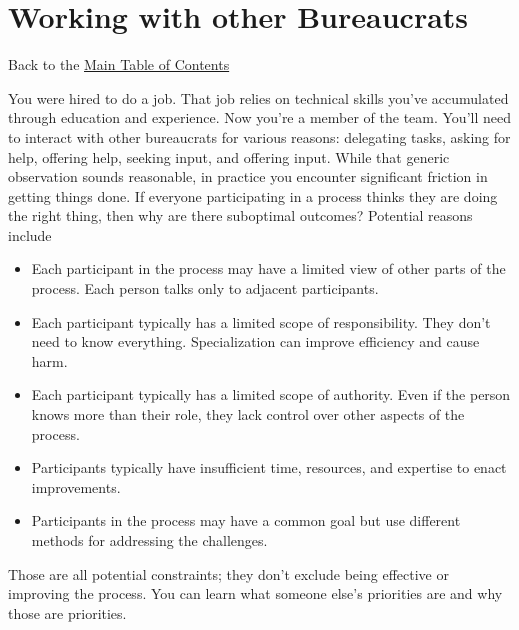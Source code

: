 \chapter{Working with other Bureaucrats\label{sec:working-with-other-bureaucrats}}
{\footnotesize Back to the \hyperref[sec:toc]{Main Table of Contents}}
\minitoc 

You were hired to do a job. That job relies on technical skills you've accumulated through education and experience. Now you're a member of 
 the team. You'll need to interact with other bureaucrats for various reasons:
delegating tasks, asking for help, offering help, seeking input, and offering input.
While that generic observation sounds reasonable, in practice you encounter significant friction in getting things done. 
If everyone participating in a process thinks they are doing the right thing, then why are there suboptimal outcomes? Potential reasons include
\begin{itemize}
    \item Each participant in the process may have a limited view of other parts of the process. Each person talks only to adjacent participants.
    \item Each participant typically has a limited scope of responsibility. They don't need to know everything. Specialization can improve efficiency and cause harm.
    \item Each participant typically has a limited scope of authority. Even if the person knows more than  their role, they lack control over other aspects of the process.
    \item Participants typically have insufficient time, resources, and expertise to enact improvements.
    \item Participants in the process may have a common goal but use different methods for addressing the challenges.
\end{itemize}
Those are all potential constraints; they don't exclude being effective or improving the process. 
You can learn what someone else's priorities are and why those are priorities.

